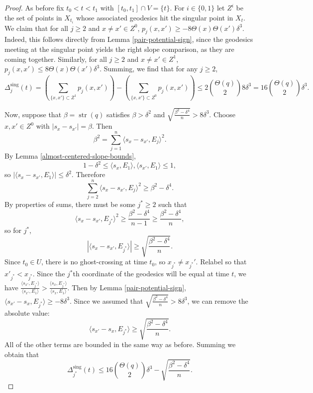 \documentclass[11pt,reqno,twoside]{amsart}
\newcommand{\sing}{\mathrm{sing}}
\DeclareMathOperator{\strength}{\mathrm{str}}
\theoremstyle{definition}
\begin{document}
    \begin{proof}
        As before fix $t_0 < t < t_1$ with $[t_0,t_1] \cap V =\{t\}$. For $i \in \{0,1\}$ let $Z^i$ be the set of points in $X_{t_i}$ whose associated geodesics hit the singular point in $X_t.$ We claim that for all $j \geq 2$ and $x \neq x' \in Z^0$, $p_j(x,x') \geq -8 \Theta(x)\Theta(x') \delta^3.$ Indeed, this follows directly from Lemma \ref{pair-potential-sign}, since the geodesics meeting at the singular point yields the right slope comparison, as they are coming together. Similarly, for all $j \geq 2$ and $x \neq x' \in Z^1$, $p_j(x,x') \leq 8 \Theta(x) \Theta(x') \delta^3.$ Summing, we find that for any $j \geq 2$,
        \[\Delta_j^{\sing}(t) = \left(\sum_{\{x,x'\} \subset Z^1} p_j(x,x')\right) - \left(\sum_{\{x,x'\} \subset Z^0} p_j(x,x') \right) \leq 2 {\Theta(q) \choose 2} 8 \delta^3 = 16 {\Theta(q) \choose 2} \delta^3.\]

        Now, suppose that $\beta = \strength(q)$ satisfies $\beta > \delta^2$ and 
        $\sqrt{\frac{\beta^2 - \delta^4}{n}} > 8\delta^3.$
        Choose $x,x' \in Z^0$ with $|s_x-s_{x'}| = \beta$. Then \[\beta^2 = \sum_{j=1}^n \langle s_x-s_{x'},E_j\rangle^2.\]
        By Lemma \ref{almost-centered-slope-bounds}, 
        \[1 -\delta^2 \leq \langle s_x,E_1\rangle, \langle s_{x'},E_1\rangle \leq 1,\]
        so $|\langle s_x-s_{x'},E_1\rangle| \leq \delta^2.$ Therefore 
\[\sum_{j=2}^n \langle s_x-s_{x'},E_j\rangle^2 \geq \beta^2 - \delta^4.\]
By properties of sums, there must be some $j^* \geq 2$ such that
\[\langle s_x-s_{x'}, E_{j^*}\rangle^2 \geq \frac{\beta^2-\delta^4}{n-1} \geq \frac{\beta^2-\delta^4}{n},\]
so for $j^*$,
\[|\langle s_x - s_{x'},E_{j^*}\rangle| \geq \sqrt{\frac{\beta^2-\delta^4}{n}}.\]
Since $t_0 \in U$, there is no ghost-crossing at time $t_0$, so $x_{j^*} \neq x_{j^*}'$. Relabel so that $x'_{j^*} < x_{j^*}$. Since the $j^*$th coordinate of the geodesics will be equal at time $t$, we have
$\frac{\langle s_{x'},E_{j^*}\rangle}{\langle s_{x'},E_1\rangle} > \frac{\langle s_{x},E_{j^*}\rangle}{\langle s_{x},E_1\rangle}$.
Then by Lemma \ref{pair-potential-sign}, 
$\langle s_{x'}-s_{x},E_{j^*}\rangle \geq -8 \delta^3.$
Since we assumed that  $\sqrt{\frac{\beta^2 - \delta^4}{n}} > 8\delta^3$, we can remove the absolute value:
\[\langle s_{x'} - s_{x},E_{j^*}\rangle \geq \sqrt{\frac{\beta^2-\delta^4}{n}}.\]
All of the other terms are bounded in the same way as before. Summing we obtain that
 \[\Delta^\sing_{j^*}(t) \leq 16 {\Theta(q) \choose 2}\delta^3- \sqrt{\frac{\beta^2-\delta^4}{n}}.\]
    \end{proof}
\end{document}
